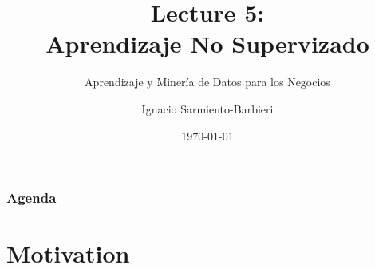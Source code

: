 \documentclass[
  shownotes,
  xcolor={svgnames},
  hyperref={colorlinks,citecolor=DarkBlue,linkcolor=DarkRed,urlcolor=DarkBlue}
  , aspectratio=169]{beamer}
\begin{document}
\title[Lecture 5]{Lecture 5: \\ Aprendizaje No Supervizado}
\subtitle{Aprendizaje y Minería de Datos para los Negocios}
\date{\today}

\author[Sarmiento-Barbieri]{Ignacio Sarmiento-Barbieri}


\begin{frame}[noframenumbering]
\maketitle
\end{frame}





\begin{frame}
\frametitle{Agenda}

\tableofcontents

\end{frame}

\section{Motivation }
\end{document}
